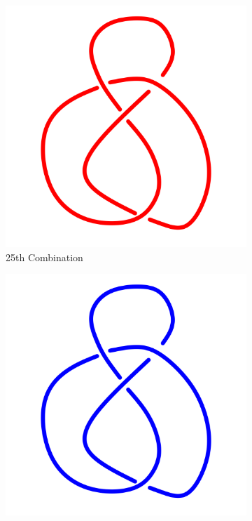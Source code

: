 \documentclass[a4paper,9pt]{article}
\begin{document}
\begin{enumerate}
\begin{figure}[h!]
\begin{subfigure}[b]{0.3\linewidth}
		\includegraphics[width=\linewidth]{picture/knotpict/knot-25}
		\caption{25th Combination}
	\end{subfigure}
	\qquad
	\begin{subfigure}[b]{0.3\linewidth}
		\centering
		\includegraphics[width=\linewidth]{picture/knotpict/knot-26}

\end{subfigure}
\end{figure}
\end{enumerate}
\end{document}
